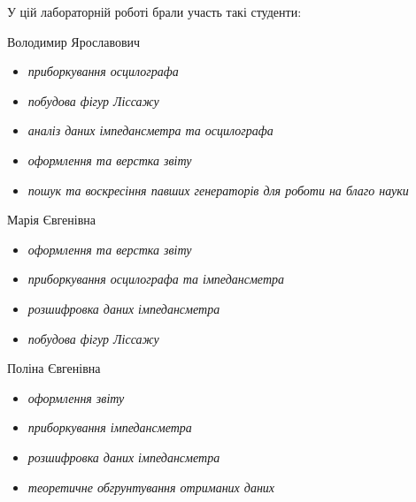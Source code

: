 
У цій лабораторній роботі брали участь такі студенти:
\begin{itemize}
 Володимир Ярославович
\begin{itemize}
    \item\textit{приборкування осцилографа}
    \item\textit{побудова фігур Ліссажу}
    \item\textit{аналіз даних імпедансметра та осцилографа}
    \item\textit{оформлення та верстка звіту}
    \item\textit{пошук та воскресіння павших генераторів для роботи на благо науки}
\end{itemize}
 Марія Євгенівна
\begin{itemize}
    \item\textit{оформлення та верстка звіту}
    \item\textit{приборкування осцилографа та імпедансметра}
    \item\textit{розшифровка даних імпедансметра}
    \item\textit{побудова фігур Ліссажу}
\end{itemize}
 Поліна Євгенівна
\begin{itemize}
    \item\textit{оформлення звіту}
    \item\textit{приборкування імпедансметра}
    \item\textit{розшифровка даних імпедансметра}
    \item\textit{теоретичне обгрунтування отриманих даних}
\end{itemize}
\end{itemize}